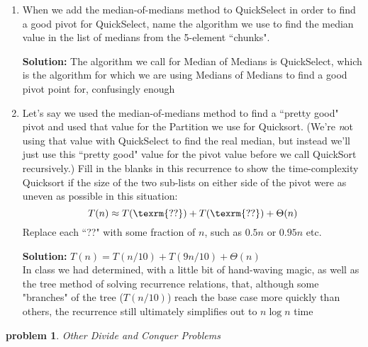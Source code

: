 \documentclass[10pt]{article}
\newtheorem{problem}{\sc\color{cit}problem}
\begin{document}
    \begin{enumerate}   
    	\item When we add the median-of-medians method to QuickSelect in order to find a good pivot for QuickSelect, name the algorithm we use to find the median value in the list of medians from the 5-element ``chunks".
    	
    	\textbf{Solution:}  The algorithm we call for Median of Medians is QuickSelect, which is the algorithm for which we are using Medians of Medians to find a good pivot point for, confusingly enough

        \item Let's say we used the median-of-medians method to find a ``pretty good" pivot and used that value for the Partition we use for Quicksort.  (We're {\emph not} using that value with QuickSelect to find the real median, but instead we'll just use this ``pretty good" value for the pivot value before we call QuickSort recursively.)  Fill in the blanks in this recurrence to show the time-complexity Quicksort if the size of the two sub-lists on either side of the pivot were as uneven as possible in this situation:
                $$ T(n) \approx T( \texrm{??} ) + T( \texrm{??} ) + \Theta(n)$$
        Replace each ``??" with some fraction of $n$, such as $ 0.5 n$ or $ 0.95 n$ etc.
        
        \textbf{Solution:}  $T(n) = T(n/10) + T(9n/10) + \Theta(n)$ \\
        In class we had determined, with a little bit of hand-waving magic, as well as the tree method of solving recurrence relations, that, although some "branches" of the tree ($T(n/10)$) reach the base case more quickly than others, the recurrence still ultimately simplifies out to $n \log n$ time
        
    \end{enumerate} 


\begin{problem} Other Divide and Conquer Problems \end{problem}
\end{document}
